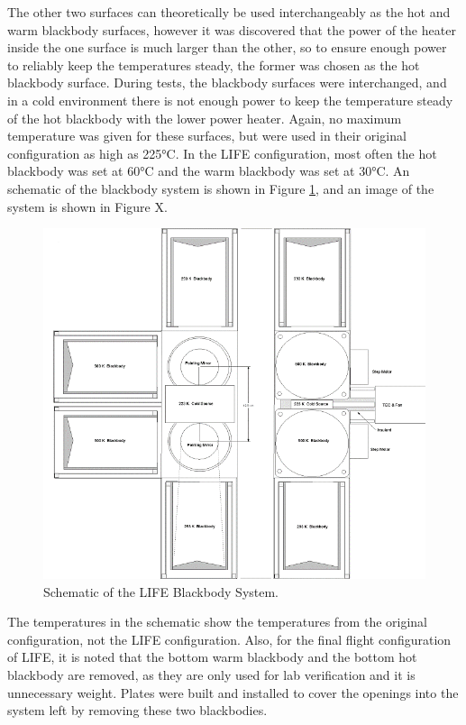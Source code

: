 The other two surfaces can theoretically be used interchangeably as the hot and warm blackbody surfaces, however it was discovered that the power of the heater inside the one surface is much larger than the other, so to ensure enough power to reliably keep the temperatures steady, the former was chosen as the hot blackbody surface. During tests, the blackbody surfaces were interchanged, and in a cold environment there is not enough power to keep the temperature steady of the hot blackbody with the lower power heater. Again, no maximum temperature was given for these surfaces, but were used in their original configuration as high as 225°C. In the LIFE configuration, most often the hot blackbody was set at 60°C and the warm blackbody was set at 30°C. An schematic of the blackbody system is shown in Figure \ref{fig:bb_schematic}, and an image of the  system is shown in Figure X.

\begin{figure}
    \centering
    \includegraphics{chap3_images/Blackbody_schematic.png}
    \caption{Schematic of the LIFE Blackbody System.}
    \label{fig:bb_schematic}
\end{figure}

The temperatures in the schematic show the temperatures from the original configuration, not the LIFE configuration. Also, for the final flight configuration of LIFE, it is noted that the bottom warm blackbody and the bottom hot blackbody are removed, as they are only used for lab verification and it is unnecessary weight. Plates were built and installed to cover the openings into the system left by removing these two blackbodies.

